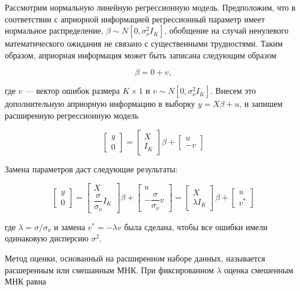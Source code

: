 Рассмотрим нормальную линейную регрессионную модель. Предположим, что в соответствии с априорной информацией регрессионный параметр имеет нормальное распределение, $\beta \sim N[0,\sigma^2_{\nu}I_K]$, обобщение на случай ненулевого математического ожидания не связано с существенными трудностями. Таким образом, априорная информация может быть записана следующим образом

\[
\beta=0+v,
\]

где $v$ --- вектор ошибок размера  $K \times 1$  и $v \sim N[0,\sigma^2_{\nu}I_{K}]$. Внесем это дополнительную априорную информацию в выборку $y=X\beta+u$, и запишем расширенную регрессионную модель

\[
\begin{bmatrix}
y\\0
\end{bmatrix}
=
\begin{bmatrix}
X\\I_{K}
\end{bmatrix}
\beta+
\begin{bmatrix}
u\\{-v}
\end{bmatrix}
\]

Замена параметров даст следующие результаты:

\[
\begin{bmatrix}
y\\0
\end{bmatrix}
=
\begin{bmatrix}
X\\\dfrac{\sigma}{\sigma_\nu}I_{K}
\end{bmatrix}
\beta+
\begin{bmatrix}
u\\-\dfrac{\sigma}{\sigma_\nu}{v}
\end{bmatrix}
=
\begin{bmatrix}
X\\{\lambda}I_{K}
\end{bmatrix}
\beta+
\begin{bmatrix}
u\\{v^{*}}
\end{bmatrix}
\]

где $\lambda=\sigma/\sigma_{\nu}$ и  замена $v^{*}=-\lambda{v}$ была сделана, чтобы все ошибки имели одинаковую дисперсию $\sigma^2$.

Метод оценки, основанный на расширенном наборе данных, называется расшеренным или смешанным МНК. При фиксированном $\lambda$ оценка смешенным МНК равна

